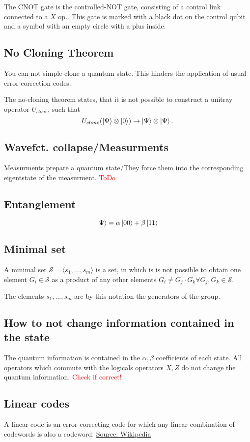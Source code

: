 The CNOT gate is the controlled-NOT gate, consisting of a control link connected to a $X$ op.. 
This gate is marked with a black dot on the control qubit and a symbol with an empty circle with a plus inside.


\subsection{No Cloning Theorem}\label{sec:basic.math.no_cloning_theorem}
You can not simple clone a quantum state. 
This hinders the application of usual error correction codes.

The no-cloning theorem states, that it is not possible to construct a unitray operator $U_{clone}$, such that 
\begin{equation}
    U_{clone} (\ket{\Psi} \otimes \ket{0} ) \rightarrow \ket{\Psi} \otimes \ket{\Psi}.
\end{equation}
\cite{QECintro}


\subsection{Wavefct. collapse/Measurments}\label{sec:basic.math.wavefct_collpase}
Measurments prepare a quantum state/They force them into the corresponding eigentstate of the measurment.
\textcolor{red}{ToDo}


\subsection{Entanglement}
\begin{equation}
    \ket{\Psi} = \alpha \ket{00} + \beta \ket{11}
\end{equation}


\subsection{Minimal set}\label{sec:basic.math.minimal_set}

A minimal set $\mathcal{S}= \langle s_1,...,s_m\rangle$ is a set, 
in which is is not possible to obtain one element $G_i \in \mathcal{S}$ as a product of any other elements  $G_i \ne G_j \cdot G_k \forall G_j,G_k\in\mathcal{S}$.\cite{QECintro}

The elements $s_1, ..., s_m$ are by this notation the generators of the group.



\subsection{How to not change information contained in the state}
The quantum information is contained in the $\alpha,\beta$ coefficients of each state.
All operators which commute with the logicals operators $\bar{X},\bar{Z}$ do not change the quantum information. \cite{QECmemory}
\textcolor{red}{Check if correct!}


\subsection{Linear codes}\label{sec:basic.math.linear_codes}
A linear code is an error-correcting code for which any linear combination of codewords is also a codeword. \href{https://en.wikipedia.org/wiki/Linear_code}{Source: Wikipedia} 
